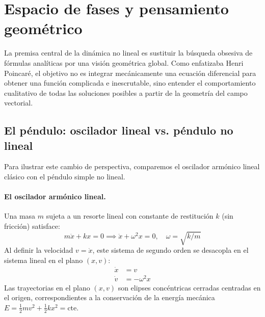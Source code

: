 \section{Espacio de fases y pensamiento geométrico}

La premisa central de la dinámica no lineal es sustituir la búsqueda obsesiva de fórmulas analíticas por una visión geométrica global. Como enfatizaba Henri Poincaré, el objetivo no es integrar mecánicamente una ecuación diferencial para obtener una función complicada e inescrutable, sino entender el comportamiento cualitativo de todas las soluciones posibles a partir de la geometría del campo vectorial.

\subsection{El péndulo: oscilador lineal vs. péndulo no lineal}

Para ilustrar este cambio de perspectiva, comparemos el oscilador armónico lineal clásico con el péndulo simple no lineal.

\paragraph{El oscilador armónico lineal.}
Una masa $m$ sujeta a un resorte lineal con constante de restitución $k$ (sin fricción) satisface:
\begin{equation}
    m \ddot{x} + k x = 0 \implies \ddot{x} + \omega^2 x = 0, \quad \omega = \sqrt{k/m}
\end{equation}
Al definir la velocidad $v = \dot{x}$, este sistema de segundo orden se desacopla en el sistema lineal en el plano $(x, v)$:
\begin{align}
    \dot{x} &= v \label{eq:armonico_x}\\
    \dot{v} &= -\omega^2 x \label{eq:armonico_v}
\end{align}
Las trayectorias en el plano $(x, v)$ son elipses concéntricas cerradas centradas en el origen, correspondientes a la conservación de la energía mecánica $E = \frac{1}{2}mv^2 + \frac{1}{2}kx^2 = \text{cte}$.

